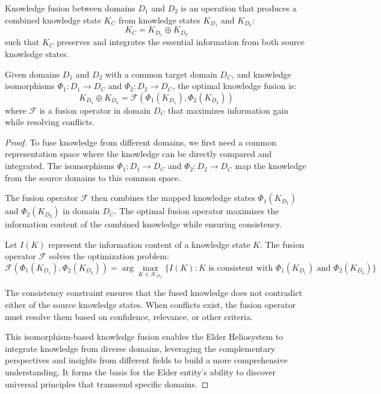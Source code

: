 \begin{definition}
Knowledge fusion between domains $D_1$ and $D_2$ is an operation that produces a combined knowledge state $K_C$ from knowledge states $K_{D_1}$ and $K_{D_2}$:
\begin{equation}
K_C = K_{D_1} \oplus K_{D_2}
\end{equation}
such that $K_C$ preserves and integrates the essential information from both source knowledge states.
\end{definition}

\begin{theorem}
Given domains $D_1$ and $D_2$ with a common target domain $D_C$, and knowledge isomorphisms $\Phi_1: D_1 \to D_C$ and $\Phi_2: D_2 \to D_C$, the optimal knowledge fusion is:
\begin{equation}
K_{D_1} \oplus K_{D_2} = \mathcal{F}(\Phi_1(K_{D_1}), \Phi_2(K_{D_2}))
\end{equation}
where $\mathcal{F}$ is a fusion operator in domain $D_C$ that maximizes information gain while resolving conflicts.
\end{theorem}

\begin{proof}
To fuse knowledge from different domains, we first need a common representation space where the knowledge can be directly compared and integrated. The isomorphisms $\Phi_1: D_1 \to D_C$ and $\Phi_2: D_2 \to D_C$ map the knowledge from the source domains to this common space.

The fusion operator $\mathcal{F}$ then combines the mapped knowledge states $\Phi_1(K_{D_1})$ and $\Phi_2(K_{D_2})$ in domain $D_C$. The optimal fusion operator maximizes the information content of the combined knowledge while ensuring consistency.

Let $I(K)$ represent the information content of a knowledge state $K$. The fusion operator $\mathcal{F}$ solves the optimization problem:
\begin{equation}
\mathcal{F}(\Phi_1(K_{D_1}), \Phi_2(K_{D_2})) = \arg\max_{K \in \mathcal{K}_{D_C}} \{I(K) : K \text{ is consistent with } \Phi_1(K_{D_1}) \text{ and } \Phi_2(K_{D_2})\}
\end{equation}

The consistency constraint ensures that the fused knowledge does not contradict either of the source knowledge states. When conflicts exist, the fusion operator must resolve them based on confidence, relevance, or other criteria.

This isomorphism-based knowledge fusion enables the Elder Heliosystem to integrate knowledge from diverse domains, leveraging the complementary perspectives and insights from different fields to build a more comprehensive understanding. It forms the basis for the Elder entity's ability to discover universal principles that transcend specific domains.
\end{proof}

